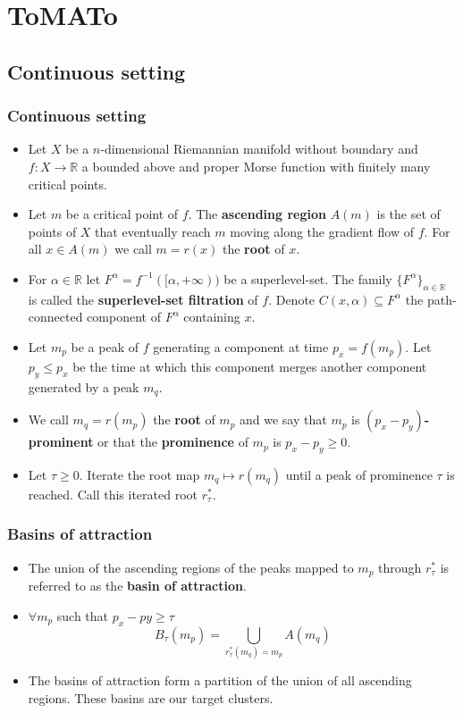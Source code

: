 \documentclass{beamer}
\theoremstyle{definition}
\newcommand{\R}{\mathbb{R}}
\begin{document}
\section{ToMATo}
\subsection{Continuous setting}
\begin{frame}[fragile]
\frametitle{Continuous setting}
\begin{itemize}
\item<1-> Let $X$ be a $n$-dimensional Riemannian manifold without boundary and $f:X\to\R$ a bounded above and proper Morse function with finitely many critical points.
\item<2-> Let $m$ be a critical point of $f$. The \textbf{ascending region} $A(m)$ is the set of points of $X$ that eventually reach $m$ moving along the gradient flow of $f$. For all $x\in A(m)$ we call $m=r(x)$ the \textbf{root} of $x$.

\item<3-> For $\alpha\in\R$ let $F^\alpha=f^{-1}([\alpha,+\infty))$ be a superlevel-set. The family $\{F^\alpha\}_{\alpha\in\R}$ is called the \textbf{superlevel-set filtration} of $f$. Denote $C(x,\alpha)\subseteq F^\alpha$ the path-connected component of $F^\alpha$ containing $x$. %
\end{itemize}
\end{frame}

\begin{frame}
\begin{itemize}
\item<1-> Let $m_p$ be a peak of $f$ generating a component at time $p_x=f(m_p)$. Let $p_y\leq p_x$ be the time at which this component merges another component generated by a peak $m_q$. %
\item<2->We call $m_q=r(m_p)$ the \textbf{root} of $m_p$ and we say that $m_p$ is \textbf{$(p_x-p_y)$-prominent} or that the \textbf{prominence} of $m_p$ is $p_x-p_y\geq 0$.
\item<3-> Let $\tau\geq 0$. Iterate the root map $m_q\mapsto r(m_q)$ until a peak of prominence $\tau$ is reached. Call this iterated root $r^*_\tau$.
\end{itemize}
\end{frame}
\begin{frame}
\frametitle{Basins of attraction}
\begin{itemize}
\item<1-> The union of the ascending regions of the peaks mapped to $m_p$ through $r^*_\tau$ is referred to as the \textbf{basin of attraction}.
\item<2-> $\forall m_p$ such that $p_x - py \geq\tau$
\[B_\tau(m_p)=\bigcup_{r^*_\tau(m_q)=m_p} A(m_q)\]
\item<3->[]The basins of attraction form a partition of the union of all ascending
regions. These basins are our target clusters.
\end{itemize}

\end{frame}
\end{document}
